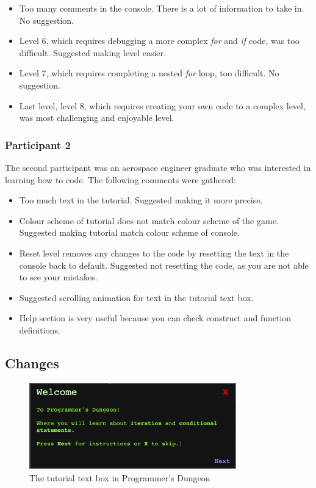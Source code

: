 \documentclass[a4paper,11.5pt]{report}
\numberwithin{figure}{section}
\numberwithin{table}{section}
\numberwithin{equation}{section}
\numberwithin{equation}{section}
\begin{document}
\begin{itemize}
	\item Too many comments in the console. There is a lot of information to take in. No suggestion.
	\item Level 6, which requires debugging a more complex \textit{for} and \textit{if} code, was too difficult. Suggested making level easier.
	\item Level 7, which requires completing a nested \textit{for} loop, too difficult. No suggestion.
	\item Last level, level 8, which requires creating your own code to a complex level, was most challenging and enjoyable level.
\end{itemize}

\subsubsection*{Participant 2}

The second participant was an aerospace engineer graduate who was interested in learning how to code. The following comments were gathered: 

\begin{itemize}
	\item Too much text in the tutorial. Suggested making it more precise.
	\item Colour scheme of tutorial does not match colour scheme of the game. Suggested making tutorial match colour scheme of console.
	\item Reset level removes any changes to the code by resetting the text in the console back to default. Suggested not resetting the code, as you are not able to see your mistakes.
	\item Suggested scrolling animation for text in the tutorial text box.
	\item Help section is very useful because you can check construct and function definitions.
\end{itemize}

\subsection{Changes}

\begin{figure}[H]
 \centering
    \includegraphics[width=0.8\textwidth]{tutorialtextbox}
       \captionsetup{justification=centering}
\caption{The tutorial text box in Programmer's Dungeon}
\label{fig:tutorialtextbox}
\end{figure}
\end{document}
